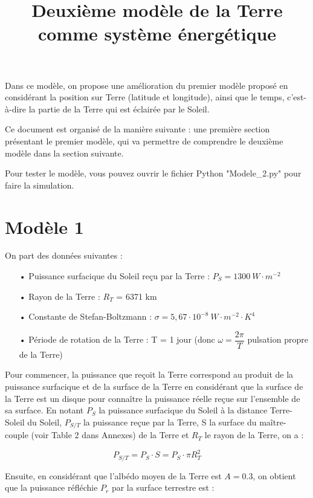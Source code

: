\documentclass[a4paper,11pt]{article}
\title{Deuxième modèle de la Terre comme système énergétique}
\begin{document}
\maketitle

Dans ce modèle, on propose une amélioration du premier modèle proposé en considérant la position sur Terre (latitude et longitude), ainsi que le temps, c'est-à-dire la partie de la Terre qui est éclairée par le Soleil. 

Ce document est organisé de la manière suivante : une première section présentant le premier modèle, qui va permettre de comprendre le deuxième modèle dans la section suivante.

Pour tester le modèle, vous pouvez ouvrir le fichier Python "Modele\_2.py" pour faire la simulation.

\section{Modèle 1}

On part des données suivantes :

\begin{enumerate}

\item[•] Puissance surfacique du Soleil reçu par la Terre : $P_S = 1300 ~ W \cdot m^{-2}$
\item[•] Rayon de la Terre : $R_T$ = 6371 km
\item[•] Constante de Stefan-Boltzmann : $\sigma = 5,67 \cdot 10^{-8} ~ W \cdot m^{-2} \cdot K^4$ 
\item[•] Période de rotation de la Terre : T = 1 jour (donc $\omega = \dfrac{2\pi}{T}$ pulsation propre de la Terre)

\end{enumerate}

Pour commencer, la puissance que reçoit la Terre correspond au produit de la puissance surfacique et de la surface de la Terre en considérant que la surface de la Terre est un disque pour connaître la puissance réelle reçue sur l'ensemble de sa surface. En notant $P_S$ la puissance surfacique du Soleil à la distance Terre-Soleil du Soleil, $P_{S/T}$ la puissance reçue par la Terre, S la surface du maître-couple (voir Table 2 dans Annexes) de la Terre et $R_T$ le rayon de la Terre, on a :

\[ P_{S/T} = P_S \cdot S = P_S \cdot \pi R_T^2  \]

Ensuite, en considérant que l'albédo moyen de la Terre est $A = 0.3$, on obtient que la puissance réfléchie $P_r$ par la surface terrestre est :
\end{document}
